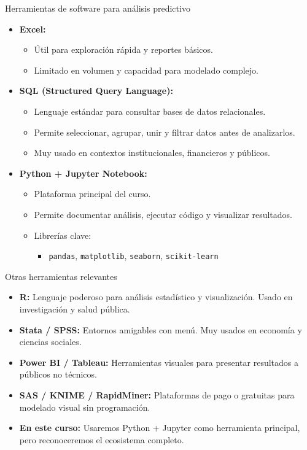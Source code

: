 \documentclass{beamer}
\begin{document}
\begin{frame}{Herramientas de software para análisis predictivo}
	\begin{itemize}
		\item \textbf{Excel:}
		\begin{itemize}
			\item Útil para exploración rápida y reportes básicos.
			\item Limitado en volumen y capacidad para modelado complejo.
		\end{itemize}
		
		\item \textbf{SQL (Structured Query Language):}
		\begin{itemize}
			\item Lenguaje estándar para consultar bases de datos relacionales.
			\item Permite seleccionar, agrupar, unir y filtrar datos antes de analizarlos.
			\item Muy usado en contextos institucionales, financieros y públicos.
		\end{itemize}
		
		\item \textbf{Python + Jupyter Notebook:}
		\begin{itemize}
			\item Plataforma principal del curso.
			\item Permite documentar análisis, ejecutar código y visualizar resultados.
			\item Librerías clave:
			\begin{itemize}
				\item \texttt{pandas}, \texttt{matplotlib}, \texttt{seaborn}, \texttt{scikit-learn}
			\end{itemize}
		\end{itemize}
	\end{itemize}
\end{frame}

\begin{frame}{Otras herramientas relevantes}
	\begin{itemize}
		\item \textbf{R:} Lenguaje poderoso para análisis estadístico y visualización. Usado en investigación y salud pública.
		\item \textbf{Stata / SPSS:} Entornos amigables con menú. Muy usados en economía y ciencias sociales.
		\item \textbf{Power BI / Tableau:} Herramientas visuales para presentar resultados a públicos no técnicos.
		\item \textbf{SAS / KNIME / RapidMiner:} Plataformas de pago o gratuitas para modelado visual sin programación.
		\item \textbf{En este curso:} Usaremos Python + Jupyter como herramienta principal, pero reconoceremos el ecosistema completo.
	\end{itemize}
\end{frame}
\end{document}
